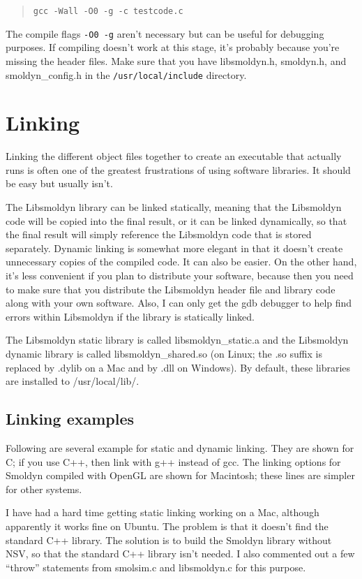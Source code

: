 \documentclass {book}
\begin{document}
\begin{quote}
\lstinline{gcc -Wall -O0 -g -c testcode.c}
\end{quote}

The compile flags \texttt{-O0 -g} aren't necessary but can be useful for debugging purposes. If compiling doesn't work at this stage, it's probably because you're missing the header files. Make sure that you have libsmoldyn.h, smoldyn.h, and smoldyn\_config.h in the \texttt{/usr/local/include} directory.

\section{Linking}

Linking the different object files together to create an executable that actually runs is often one of the greatest frustrations of using software libraries. It should be easy but usually isn't.

The Libsmoldyn library can be linked statically, meaning that the Libsmoldyn code will be copied into the final result, or it can be linked dynamically, so that the final result will simply reference the Libsmoldyn code that is stored separately. Dynamic linking is somewhat more elegant in that it doesn't create unnecessary copies of the compiled code. It can also be easier. On the other hand, it's less convenient if you plan to distribute your software, because then you need to make sure that you distribute the Libsmoldyn header file and library code along with your own software. Also, I can only get the gdb debugger to help find errors within Libsmoldyn if the library is statically linked.

The Libsmoldyn static library is called libsmoldyn\_static.a and the Libsmoldyn dynamic library is called libsmoldyn\_shared.so (on Linux; the .so suffix is replaced by .dylib on a Mac and by .dll on Windows). By default, these libraries are installed to /usr/local/lib/.

\subsection*{Linking examples}

Following are several example for static and dynamic linking. They are shown for C; if you use C++, then link with g++ instead of gcc. The linking options for Smoldyn compiled with OpenGL are shown for Macintosh; these lines are simpler for other systems.

I have had a hard time getting static linking working on a Mac, although apparently it works fine on Ubuntu. The problem is that it doesn't find the standard C++ library. The solution is to build the Smoldyn library without NSV, so that the standard C++ library isn't needed. I also commented out a few ``throw'' statements from smolsim.c and libsmoldyn.c for this purpose.
\end{document}
